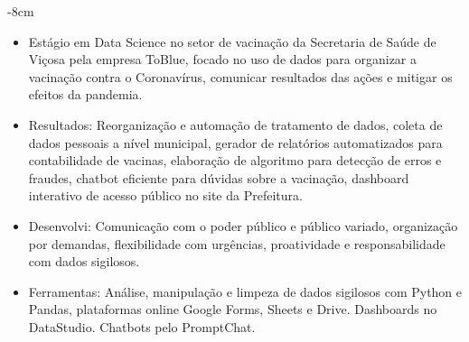 \documentclass[10pt,a4paper,ragged2e]{altacv}
\begin{document}

\begin{adjustwidth}{}{-8cm}
\makecvheader
\end{adjustwidth}




\begin{itemize}

\item Estágio em Data Science no setor de vacinação da Secretaria de Saúde de Viçosa pela empresa ToBlue, focado no uso de dados para organizar a vacinação contra o Coronavírus, comunicar resultados das ações e mitigar os efeitos da pandemia. \\
\item Resultados: Reorganização e automação de tratamento de dados, coleta de dados pessoais a nível municipal, gerador de relatórios automatizados para contabilidade de vacinas, elaboração de algoritmo para detecção de erros e fraudes, chatbot eficiente para dúvidas sobre a vacinação, dashboard interativo de acesso público no site da Prefeitura.\\
\item Desenvolvi: Comunicação com o poder público e público variado, organização por demandas, flexibilidade com urgências, proatividade e responsabilidade com dados sigilosos. \\
\item Ferramentas: Análise, manipulação e limpeza de dados sigilosos com Python e Pandas, plataformas online Google Forms, Sheets e Drive. Dashboards no DataStudio. Chatbots pelo PromptChat.\\


\end{itemize}
\end{document}
